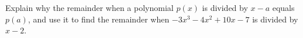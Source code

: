Explain why the remainder when a polynomial $p(x)$ is divided by $x-a$ equals $p(a)$, and use it to find the remainder when $-3x^3-4x^2+10x-7$ is divided by $x-2$.
